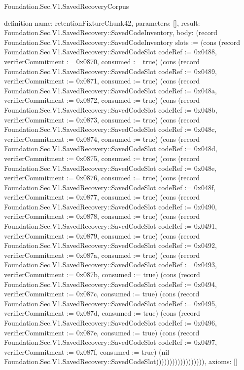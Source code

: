 \begin{lexlean}{Foundation.Sec.V1.SavedRecoveryCorpus}
\begin{semanticmodule}
definition{
  name: retentionFixtureChunk42,
  parameters: [],
  result: Foundation.Sec.V1.SavedRecovery::SavedCodeInventory,
  body: (record Foundation.Sec.V1.SavedRecovery::SavedCodeInventory {slots := (cons (record Foundation.Sec.V1.SavedRecovery::SavedCodeSlot {codeRef := 0x0488, verifierCommitment := 0x0870, consumed := true}) (cons (record Foundation.Sec.V1.SavedRecovery::SavedCodeSlot {codeRef := 0x0489, verifierCommitment := 0x0871, consumed := true}) (cons (record Foundation.Sec.V1.SavedRecovery::SavedCodeSlot {codeRef := 0x048a, verifierCommitment := 0x0872, consumed := true}) (cons (record Foundation.Sec.V1.SavedRecovery::SavedCodeSlot {codeRef := 0x048b, verifierCommitment := 0x0873, consumed := true}) (cons (record Foundation.Sec.V1.SavedRecovery::SavedCodeSlot {codeRef := 0x048c, verifierCommitment := 0x0874, consumed := true}) (cons (record Foundation.Sec.V1.SavedRecovery::SavedCodeSlot {codeRef := 0x048d, verifierCommitment := 0x0875, consumed := true}) (cons (record Foundation.Sec.V1.SavedRecovery::SavedCodeSlot {codeRef := 0x048e, verifierCommitment := 0x0876, consumed := true}) (cons (record Foundation.Sec.V1.SavedRecovery::SavedCodeSlot {codeRef := 0x048f, verifierCommitment := 0x0877, consumed := true}) (cons (record Foundation.Sec.V1.SavedRecovery::SavedCodeSlot {codeRef := 0x0490, verifierCommitment := 0x0878, consumed := true}) (cons (record Foundation.Sec.V1.SavedRecovery::SavedCodeSlot {codeRef := 0x0491, verifierCommitment := 0x0879, consumed := true}) (cons (record Foundation.Sec.V1.SavedRecovery::SavedCodeSlot {codeRef := 0x0492, verifierCommitment := 0x087a, consumed := true}) (cons (record Foundation.Sec.V1.SavedRecovery::SavedCodeSlot {codeRef := 0x0493, verifierCommitment := 0x087b, consumed := true}) (cons (record Foundation.Sec.V1.SavedRecovery::SavedCodeSlot {codeRef := 0x0494, verifierCommitment := 0x087c, consumed := true}) (cons (record Foundation.Sec.V1.SavedRecovery::SavedCodeSlot {codeRef := 0x0495, verifierCommitment := 0x087d, consumed := true}) (cons (record Foundation.Sec.V1.SavedRecovery::SavedCodeSlot {codeRef := 0x0496, verifierCommitment := 0x087e, consumed := true}) (cons (record Foundation.Sec.V1.SavedRecovery::SavedCodeSlot {codeRef := 0x0497, verifierCommitment := 0x087f, consumed := true}) (nil Foundation.Sec.V1.SavedRecovery::SavedCodeSlot)))))))))))))))))}),
  axioms: []
}


\end{semanticmodule}
\end{lexlean}
